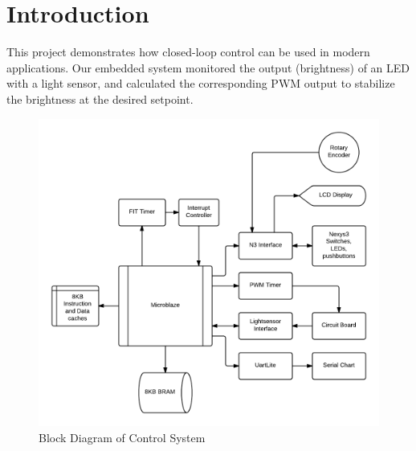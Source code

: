 \documentclass[11pt]{article}
\begin{document}




\section{Introduction} 
This project demonstrates how closed-loop control can be used in modern applications.  Our embedded system monitored the output (brightness) of an LED with a light sensor, and calculated the corresponding PWM output to stabilize the brightness at the desired setpoint.  

 

	\begin{figure}[h]\centering
	\includegraphics[height=0.7\textwidth]{images/block_diagram.png}
	\caption{Block Diagram of Control System}
		\label{diagram}
	\end{figure}
\end{document}
